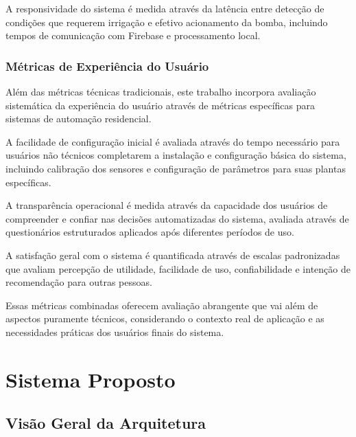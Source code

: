 \documentclass[twoside,english,brazilian]{UNISINOSmonografia}
\begin{document}
A responsividade do sistema é medida através da latência entre detecção de condições que requerem irrigação e efetivo acionamento da bomba, incluindo tempos de comunicação com Firebase e processamento local.

\subsection{Métricas de Experiência do Usuário}

Além das métricas técnicas tradicionais, este trabalho incorpora avaliação sistemática da experiência do usuário através de métricas específicas para sistemas de automação residencial.

A facilidade de configuração inicial é avaliada através do tempo necessário para usuários não técnicos completarem a instalação e configuração básica do sistema, incluindo calibração dos sensores e configuração de parâmetros para suas plantas específicas.

A transparência operacional é medida através da capacidade dos usuários de compreender e confiar nas decisões automatizadas do sistema, avaliada através de questionários estruturados aplicados após diferentes períodos de uso.

A satisfação geral com o sistema é quantificada através de escalas padronizadas que avaliam percepção de utilidade, facilidade de uso, confiabilidade e intenção de recomendação para outras pessoas.


Essas métricas combinadas oferecem avaliação abrangente que vai além de aspectos puramente técnicos, considerando o contexto real de aplicação e as necessidades práticas dos usuários finais do sistema.

\chapter{Sistema Proposto}

\section{Visão Geral da Arquitetura}
\end{document}
